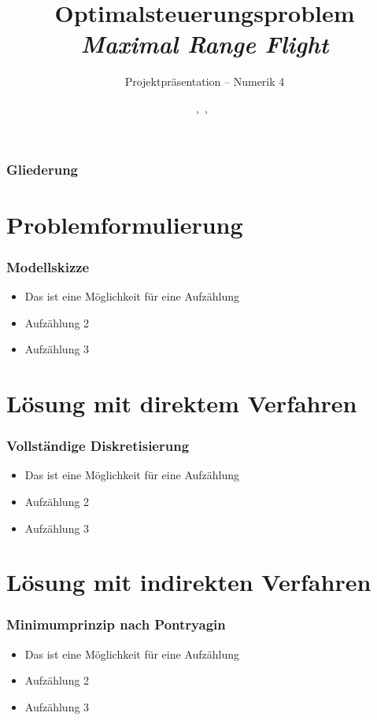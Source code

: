 \documentclass[aspectratio=169]{beamer}
\title{\textbf{Optimalsteuerungsproblem  \\ \textit{Maximal Range Flight}}}
\subtitle{Projektpräsentation -- Numerik 4}
\author{\Heiko,\ \Philipp,\ \Felix}
\institute{\institut, \fakultaet\\}
\begin{document}
\hspace*{-1.49cm}
\frame[plain]{\titlepage}

\hspace*{-0.7cm}
\begin{frame}
  \frametitle{Gliederung}
  \tableofcontents
\end{frame}


\section{Problemformulierung}
\begin{frame}
  \frametitle{Modellskizze}
\vspace{-2.6cm}
  \begin{itemize}
    \item Das ist eine M\"{o}glichkeit f\"{u}r eine Aufz\"{a}hlung
    \item Aufz\"{a}hlung 2
    \item Aufz\"{a}hlung 3
  \end{itemize}
\end{frame}

\section{Lösung mit direktem Verfahren}
\begin{frame}
  \frametitle{Vollständige Diskretisierung}
\vspace{-2.6cm}
  \begin{itemize}
    \item Das ist eine M\"{o}glichkeit f\"{u}r eine Aufz\"{a}hlung
    \item Aufz\"{a}hlung 2
    \item Aufz\"{a}hlung 3
  \end{itemize}
\end{frame}

\section{Lösung mit indirekten Verfahren}
\begin{frame}
  \frametitle{Minimumprinzip nach Pontryagin}
\vspace{-2.6cm}
  \begin{itemize}
    \item Das ist eine M\"{o}glichkeit f\"{u}r eine Aufz\"{a}hlung
    \item Aufz\"{a}hlung 2
    \item Aufz\"{a}hlung 3
  \end{itemize}
\end{frame}
\end{document}

